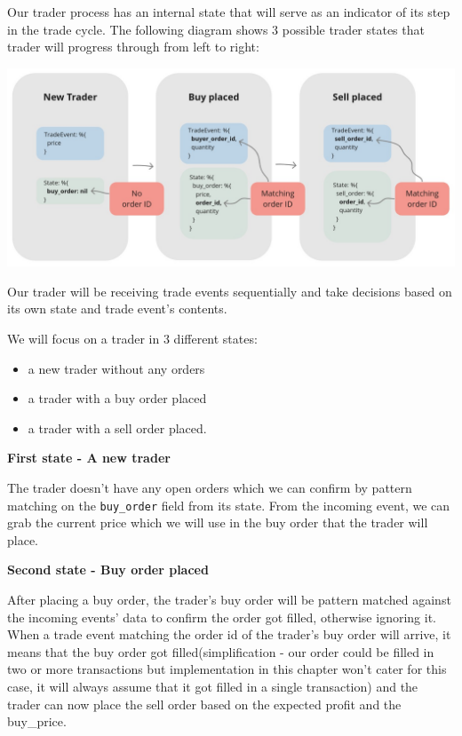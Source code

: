 \documentclass[
  oneside]{book}
\providecommand{\tightlist}{%
  \setlength{\itemsep}{0pt}\setlength{\parskip}{0pt}}
\begin{document}
Our trader process has an internal state that will serve as an indicator of its step in the trade cycle. The following diagram shows 3 possible trader states that trader will progress through from left to right:

\begin{center}\includegraphics[width=1.4\linewidth,height=0.3\textheight]{images/chapter_02_01_trader_states} \end{center}

Our trader will be receiving trade events sequentially and take decisions
based on its own state and trade event's contents.

We will focus on a trader in 3 different states:

\begin{itemize}
\tightlist
\item
  a new trader without any orders
\item
  a trader with a buy order placed
\item
  a trader with a sell order placed.
\end{itemize}

\textbf{First state - A new trader}

The trader doesn't have any open orders which we can confirm by pattern matching on the \texttt{buy\_order} field from its state. From the incoming event, we can grab
the current price which we will use in the buy order that the trader will place.

\textbf{Second state - Buy order placed}

After placing a buy order, the trader's buy order will be pattern matched against
the incoming events' data to confirm the order got filled, otherwise ignoring it.
When a trade event matching the order id of the trader's buy order will arrive, it means that the buy order got filled(simplification - our order could be filled in two or more transactions but implementation in this chapter won't cater for this case, it will always assume that it got filled in a single transaction) and the trader can now place the sell order based on the expected profit and the buy\_price.
\end{document}
